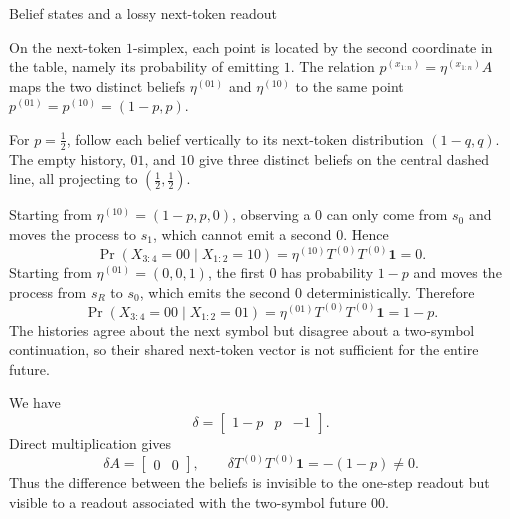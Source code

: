 \begin{exercise}[Core]{Belief states and a lossy next-token readout}
\begin{solution}
\begin{parts}
        On the next-token $1$-simplex, each point is located by the second
        coordinate in the table, namely its probability of emitting $1$.
        The relation $p^{(x_{1:n})}=\eta^{(x_{1:n})}A$ maps the two distinct
        beliefs $\eta^{(01)}$ and $\eta^{(10)}$ to the same point
        $p^{(01)}=p^{(10)}=(1-p,p)$.

        \begin{center}
          \begin{minipage}{0.96\linewidth}
            \centering
            \par
            \smallskip
            {\small For $p=\tfrac12$, follow each belief vertically to its
            next-token distribution $(1-q,q)$. The empty history, $01$, and $10$
            give three distinct beliefs on the central dashed line, all projecting
            to $(\tfrac12,\tfrac12)$.\par}
          \end{minipage}
        \end{center}

      \item Starting from $\eta^{(10)}=(1-p,p,0)$, observing a $0$ can only
        come from $s_0$ and moves the process to $s_1$, which cannot
        emit a second $0$. Hence
        \[
          \Pr(X_{3:4}=00\mid X_{1:2}=10)
            =\eta^{(10)}T^{(0)}T^{(0)}\mathbf 1=0.
        \]
        Starting from $\eta^{(01)}=(0,0,1)$, the first $0$ has probability
        $1-p$ and moves the process from $s_R$ to $s_0$, which emits the second $0$
        deterministically. Therefore
        \[
          \Pr(X_{3:4}=00\mid X_{1:2}=01)
            =\eta^{(01)}T^{(0)}T^{(0)}\mathbf 1=1-p.
        \]
        The histories agree about the next symbol but disagree about a
        two-symbol continuation, so their shared next-token vector is not
        sufficient for the entire future.

      \item We have
        \[
          \delta
            =\begin{bmatrix}1-p&p&-1\end{bmatrix}.
        \]
        Direct multiplication gives
        \[
          \delta A=\begin{bmatrix}0&0\end{bmatrix},
          \qquad
          \delta T^{(0)}T^{(0)}\mathbf 1=-(1-p)\neq0.
        \]
        Thus the difference between the beliefs is invisible to the one-step
        readout but visible to a readout associated with the two-symbol future
        $00$.
    \end{parts}
  \end{solution}
\end{exercise}

